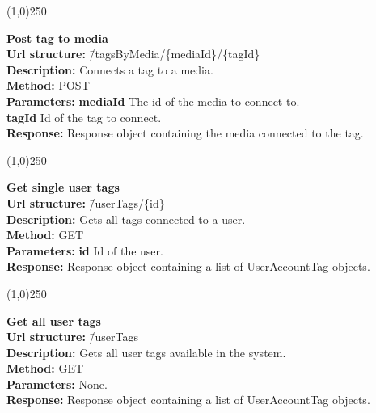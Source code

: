 \documentclass[11pt]{article}
\begin{document}
\begin{center}\line(1,0){250}\end{center}

\begin{tabbing}
\textbf{Post tag to media} \\
\textcolor{black!60}{\textbf{Url structure:}} \hspace{0.2in} \= /tagsByMedia/\{mediaId\}/\{tagId\} \\
\textcolor{black!60}{\textbf{Description:}}  \> Connects a tag to a media. \\
\textcolor{black!60}{\textbf{Method:}} \> POST \\
\textcolor{black!60}{\textbf{Parameters:}} \> \textbf{mediaId} The id of the media to connect to. \\
\> \textbf{tagId} Id of the tag to connect. \\
\textcolor{black!60}{\textbf{Response:}} \> Response object containing the media connected to the tag.
\end{tabbing}

\begin{center}\line(1,0){250}\end{center}

\begin{tabbing}
\textbf{Get single user tags} \\
\textcolor{black!60}{\textbf{Url structure:}} \hspace{0.2in} \= /userTags/\{id\} \\
\textcolor{black!60}{\textbf{Description:}}  \> Gets all tags connected to a user. \\
\textcolor{black!60}{\textbf{Method:}} \> GET \\
\textcolor{black!60}{\textbf{Parameters:}} \> \textbf{id} Id of the user. \\
\textcolor{black!60}{\textbf{Response:}} \> Response object containing a list of UserAccountTag objects.
\end{tabbing}

\begin{center}\line(1,0){250}\end{center}

\begin{tabbing}
\textbf{Get all user tags} \\
\textcolor{black!60}{\textbf{Url structure:}} \hspace{0.2in} \= /userTags \\
\textcolor{black!60}{\textbf{Description:}}  \> Gets all user tags available in the system. \\
\textcolor{black!60}{\textbf{Method:}} \> GET \\
\textcolor{black!60}{\textbf{Parameters:}} \> None. \\
\textcolor{black!60}{\textbf{Response:}} \> Response object containing a list of UserAccountTag objects.
\end{tabbing}
\end{document}
